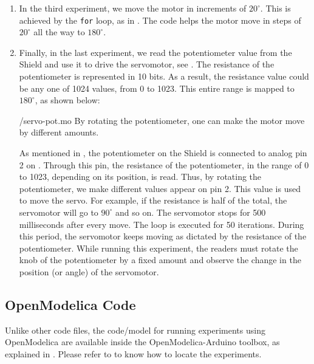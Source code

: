 \begin{enumerate}
        
  \item In the third experiment, we move the motor in increments of
        $20^\circ$.  This is achieved by the {\tt for} loop, as in
        . The code helps the motor move in steps of $20^\circ$ all
        the way to $180^\circ$.  
        
  \item Finally, in the last experiment, we read the potentiometer value
        from the Shield and use it to drive the servomotor, see
        .  The resistance of the potentiometer is
        represented in 10 bits.  As a result, the resistance value could be
        any one of 1024 values, from 0 to 1023.  This entire range is
        mapped to $180^\circ$, as shown below:
        
        {\LocSEROpenModelicacode/servo-pot.mo}
        By rotating the potentiometer, one can make
        the motor move by different amounts.
        
        As mentioned in , the potentiometer on the Shield is connected 
        to analog pin 2 on \arduino. Through this pin, the resistance of the potentiometer, in the range of 0 to 1023,
        depending on its position, is read.  Thus, by rotating the
        potentiometer, we make different values appear on pin 2.  This value
        is used to move the servo.  For example, if the resistance is half
        of the total, the servomotor will go to $90^\circ$ and so on.  The
        servomotor stops for 500 milliseconds after every move.  The loop is
        executed for 50 iterations. During this period, the servomotor keeps moving as dictated by the
        resistance of the potentiometer. While running this experiment, the readers 
        must rotate the knob of the potentiometer by a fixed amount and observe 
        the change in the position (or angle) of the servomotor. 
        
\end{enumerate}

\subsection{OpenModelica Code}
\lstset{style=mystyle}
\label{sec:servo-OpenModelica-code}
Unlike other code files, the code/model for running experiments using OpenModelica are 
available inside the OpenModelica-Arduino toolbox, as explained in .
Please refer to  to know how to locate the experiments. 

